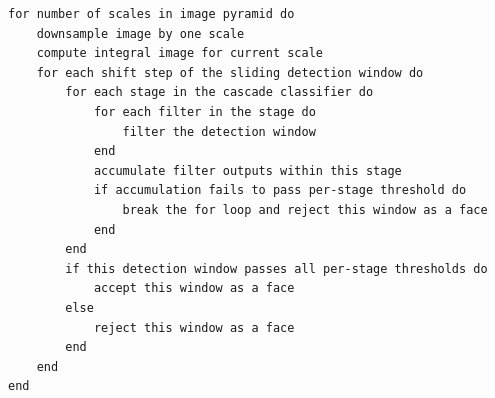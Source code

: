 \documentclass[a4paper]{article}
\begin{document}
\begin{verbatim}
for number of scales in image pyramid do
    downsample image by one scale
    compute integral image for current scale
    for each shift step of the sliding detection window do
        for each stage in the cascade classifier do
            for each filter in the stage do
                filter the detection window
            end
            accumulate filter outputs within this stage
            if accumulation fails to pass per-stage threshold do
                break the for loop and reject this window as a face
            end
        end
        if this detection window passes all per-stage thresholds do
            accept this window as a face
        else
            reject this window as a face
        end
    end
end
\end{verbatim}
\end{document}
